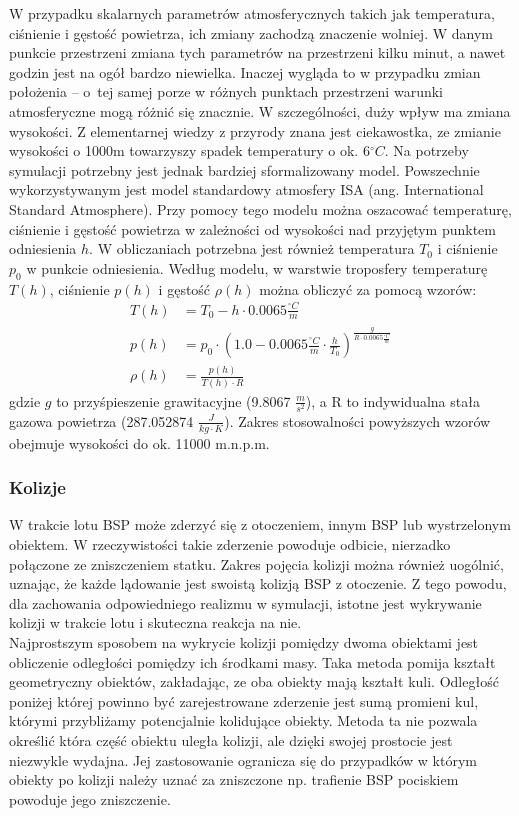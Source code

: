 W przypadku skalarnych parametrów atmosferycznych takich jak temperatura, ciśnienie i gęstość powietrza, ich zmiany zachodzą znaczenie wolniej. W danym punkcie przestrzeni zmiana tych parametrów na przestrzeni kilku minut, a nawet godzin jest na ogół bardzo niewielka. Inaczej wygląda to w przypadku zmian położenia -- o~tej samej porze w różnych punktach przestrzeni warunki atmosferyczne mogą różnić się znacznie. W szczególności, duży wpływ ma zmiana wysokości. Z elementarnej wiedzy z przyrody znana jest ciekawostka, ze zmianie wysokości o 1000m towarzyszy spadek temperatury o ok. 6$^{\circ}C$. Na potrzeby symulacji potrzebny jest jednak bardziej sformalizowany model. Powszechnie wykorzystywanym jest model standardowy atmosfery ISA (ang. International Standard Atmosphere). Przy pomocy tego modelu można oszacować temperaturę, ciśnienie i gęstość powietrza w zależności od wysokości nad przyjętym punktem odniesienia $h$. W obliczaniach potrzebna jest również temperatura $T_0$ i ciśnienie $p_0$ w punkcie odniesienia. Według modelu, w warstwie troposfery temperaturę $T(h)$, ciśnienie $p(h)$ i gęstość $\rho(h)$ można obliczyć za pomocą wzorów:
\[
	\begin{aligned}
	T(h) & = T_0 - h \cdot 0.0065 \frac{^\circ C}{m}\\
	p(h) & = p_0 \cdot \left(1.0 - 0.0065 \frac{^\circ C}{m} \cdot \frac{h}{T_0} \right)^{\frac{g}{R \cdot  0.0065 \frac{^\circ C}{m}}}\\
	\rho(h) &  = \frac{p(h)}{T(h) \cdot R}
	\end{aligned}
\]
gdzie $g$ to przyśpieszenie grawitacyjne (9.8067 $\frac{m}{s^2}$), a R to indywidualna stała gazowa powietrza (287.052874  $\frac{J}{kg \cdot K}$). Zakres stosowalności powyższych wzorów obejmuje wysokości do ok. 11000 m.n.p.m.

\subsubsection{Kolizje}

W trakcie lotu BSP może zderzyć się z otoczeniem, innym BSP lub wystrzelonym obiektem. W rzeczywistości takie zderzenie powoduje odbicie, nierzadko połączone ze zniszczeniem statku. Zakres pojęcia kolizji można również uogólnić, uznając, że każde lądowanie jest swoistą kolizją BSP z otoczenie. Z tego powodu, dla zachowania odpowiedniego realizmu w symulacji, istotne jest wykrywanie kolizji w trakcie lotu i skuteczna reakcja na nie.\\

Najprostszym sposobem na wykrycie kolizji pomiędzy dwoma obiektami jest obliczenie odległości pomiędzy ich środkami masy. Taka metoda pomija kształt geometryczny obiektów, zakładając, ze oba obiekty mają kształt kuli. Odległość poniżej której powinno być zarejestrowane zderzenie jest sumą promieni kul, którymi przybliżamy potencjalnie kolidujące obiekty. Metoda ta nie pozwala określić która część obiektu uległa kolizji, ale dzięki swojej prostocie jest niezwykle wydajna. Jej zastosowanie ogranicza się do przypadków w którym obiekty po kolizji należy uznać za zniszczone np. trafienie BSP pociskiem powoduje jego zniszczenie.\\

